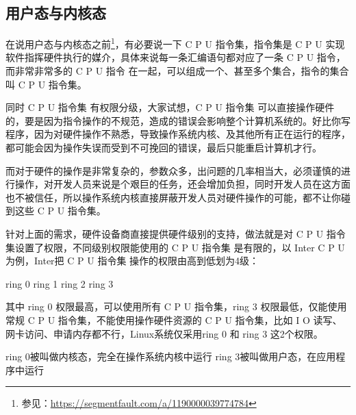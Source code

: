 \documentclass[../../../interview-questions.tex]{subfiles}
\begin{document}
\subsection{用户态与内核态}

在说用户态与内核态之前\footnote{参见：\url{https://segmentfault.com/a/1190000039774784}}，有必要说一下 C P U 指令集，指令集是 C P U 实现软件指挥硬件执行的媒介，具体来说每一条汇编语句都对应了一条 C P U 指令，而非常非常多的 C P U 指令 在一起，可以组成一个、甚至多个集合，指令的集合叫 C P U 指令集。

同时 C P U 指令集 有权限分级，大家试想，C P U 指令集 可以直接操作硬件的，要是因为指令操作的不规范\`，造成的错误会影响整个计算机系统的。好比你写程序，因为对硬件操作不熟悉，导致操作系统内核、及其他所有正在运行的程序，都可能会因为操作失误而受到不可挽回的错误，最后只能重启计算机才行。

而对于硬件的操作是非常复杂的，参数众多，出问题的几率相当大，必须谨慎的进行操作，对开发人员来说是个艰巨的任务，还会增加负担，同时开发人员在这方面也不被信任，所以操作系统内核直接屏蔽开发人员对硬件操作的可能，都不让你碰到这些 C P U 指令集。


针对上面的需求，硬件设备商直接提供硬件级别的支持，做法就是对 C P U 指令集设置了权限，不同级别权限能使用的 C P U 指令集 是有限的，以 Inter C P U 为例，Inter把 C P U 指令集 操作的权限由高到低划为4级：

ring 0
ring 1
ring 2
ring 3

其中 ring 0 权限最高，可以使用所有 C P U 指令集，ring 3 权限最低，仅能使用常规 C P U 指令集，不能使用操作硬件资源的 C P U 指令集，比如 I O 读写、网卡访问、申请内存都不行，Linux系统仅采用ring 0 和 ring 3 这2个权限。

ring 0被叫做内核态，完全在操作系统内核中运行
ring 3被叫做用户态，在应用程序中运行
\end{document}

